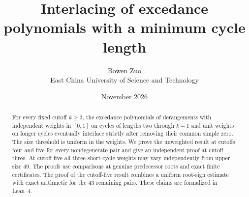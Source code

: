 \documentclass[11pt]{article}
\title{Interlacing of excedance polynomials with a minimum cycle length}
\author{Bowen Zuo\\[2pt]\small East China University of Science and Technology}
\date{November 2026}
\begin{document}
\maketitle
\begin{abstract}
For every fixed cutoff \(k\ge3\), the excedance polynomials of derangements with independent weights in \([0,1]\) on cycles of lengths two through \(k-1\) and unit weights on longer cycles eventually interlace strictly after removing their common simple zero. The size threshold is uniform in the weights. We prove the unweighted result at cutoffs four and five for every nondegenerate pair and give an independent proof at cutoff three. At cutoff five all three short-cycle weights may vary independently from upper size 49. The proofs use comparisons at genuine predecessor roots and exact finite certificates. The proof of the cutoff-five result combines a uniform root-sign estimate with exact arithmetic for the 43 remaining pairs. These claims are formalized in Lean~4.
\end{abstract}
\end{document}
